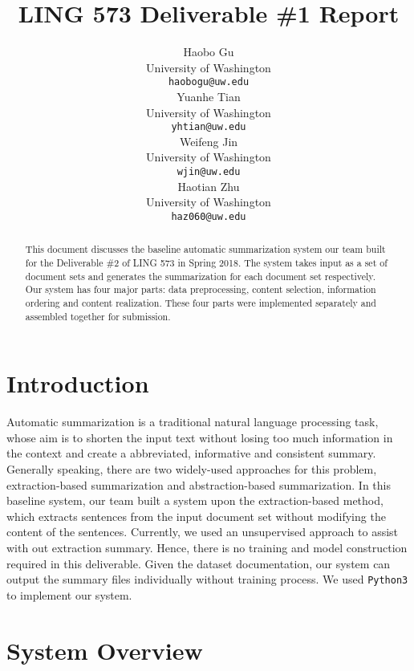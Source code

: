 \documentclass[11pt]{article}
\title{LING 573 Deliverable \#1 Report}
\author{Haobo Gu \\
  \small University of Washington \\
  {\tt haobogu@uw.edu} \\\And
 Yuanhe Tian \\
 \small University of Washington \\
  {\tt yhtian@uw.edu}\\\And
 Weifeng Jin \\
 \small University of Washington \\
  {\tt wjin@uw.edu} \\\And
 Haotian Zhu \\
 \small University of Washington \\
  {\tt haz060@uw.edu}\\}
\date{}
\begin{document}
\maketitle
\begin{abstract}

This document discusses the baseline automatic summarization system our team built for the Deliverable \#2 of LING 573 in Spring 2018. The system takes input as a set of document sets and generates the summarization for each document set respectively. Our system has four major parts: data preprocessing, content selection, information ordering and content realization. These four parts were implemented separately and assembled together for submission.
\end{abstract}

\section{Introduction}

Automatic summarization is a traditional natural language processing task, whose aim is to shorten the input text without losing too much information in the context and create a abbreviated, informative and consistent summary. Generally speaking, there are two widely-used approaches for this problem, extraction-based summarization and abstraction-based summarization. In this baseline system, our team built a system upon the extraction-based method, which extracts sentences from the input document set without modifying the content of the sentences. Currently, we used an unsupervised approach to assist with out extraction summary. Hence, there is no training and model construction required in this deliverable. Given the dataset documentation, our system can output the summary files individually without training process. We used \texttt{Python3} to implement our system.
\section{System Overview}
\end{document}
